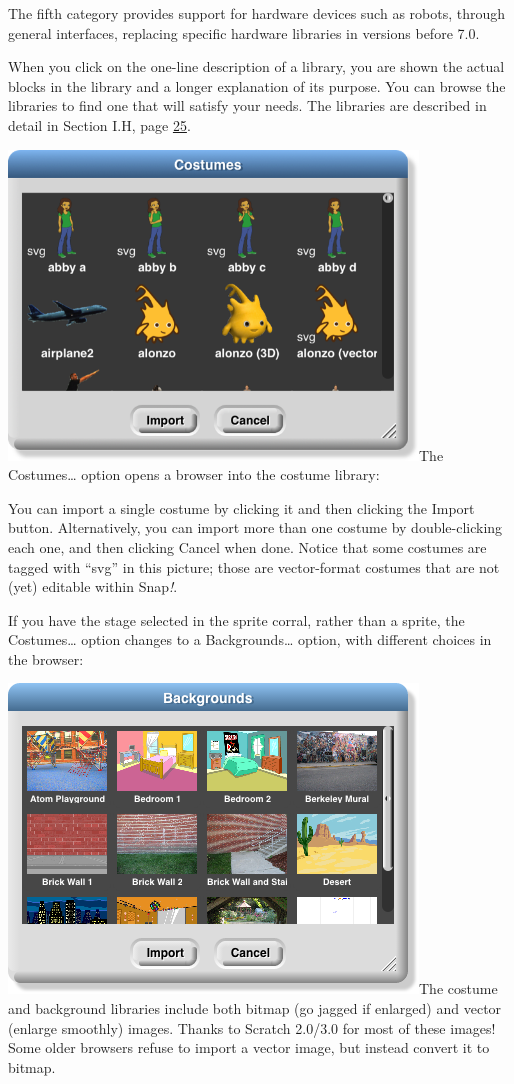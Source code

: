The fifth category provides support for hardware devices such as robots,
through general interfaces, replacing specific hardware libraries in
versions before 7.0.

When you click on the one-line description of a library, you are shown
the actual blocks in the library and a longer explanation of its
purpose. You can browse the libraries to find one that will satisfy your
needs. The libraries are described in detail in Section I.H, page
\hyperref[libraries]{25}.

\includegraphics[width=4.28125in,height=3.23958in]{media/image1000.png}The
Costumes\ldots{} option opens a browser into the costume library:

You can import a single costume by clicking it and then clicking the
Import button. Alternatively, you can import more than one costume by
double-clicking each one, and then clicking Cancel when done. Notice
that some costumes are tagged with ``svg'' in this picture; those are
vector-format costumes that are not (yet) editable within Snap\emph{!}.

If you have the stage selected in the sprite corral, rather than a
sprite, the Costumes\ldots{} option changes to a Backgrounds\ldots{}
option, with different choices in the browser:

\includegraphics[width=4.28125in,height=3.23958in]{media/image1001.png}The
costume and background libraries include both bitmap (go jagged if
enlarged) and vector (enlarge smoothly) images. Thanks to Scratch
2.0/3.0 for most of these images! Some older browsers refuse to import a
vector image, but instead convert it to bitmap.


